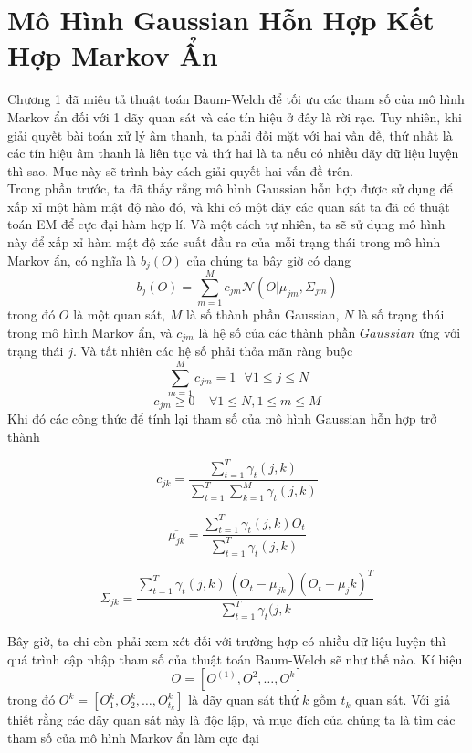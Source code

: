 \documentclass[13pt]{extreport}
\begin{document}
\section{Mô Hình Gaussian Hỗn Hợp Kết Hợp Markov Ẩn}
Chương 1 đã miêu tả thuật toán Baum-Welch để tối ưu các tham số của mô hình Markov ẩn đối với 1 dãy quan sát và các tín hiệu ở đây là rời rạc. Tuy nhiên, khi giải quyết bài toán xử lý âm thanh, ta phải đối mặt với hai vấn đề, thứ nhất là các tín hiệu âm thanh là liên tục và thứ hai là ta nếu có nhiều dãy dữ liệu luyện thì sao. Mục này sẽ trình bày cách giải quyết hai vấn đề trên. \\
Trong phần trước, ta đã thấy rằng mô hình Gaussian hỗn hợp được sử dụng để xấp xỉ một hàm mật độ nào đó, và khi có một dãy các quan sát ta đã có thuật toán EM để cực đại hàm hợp lí. Và một cách tự nhiên, ta sẽ sử dụng mô hình này để xấp xỉ hàm mật độ xác suất đầu ra của mỗi trạng thái trong mô hình Markov ẩn, có nghĩa là $b_j(O)$ của chúng ta bây giờ có dạng
$$b_j(O) = \sum_{m=1}^M c_{jm} \mathcal{N}(O| \mu_{jm}, \Sigma_{jm})$$
trong đó $O$ là một quan sát, $M$ là số thành phần Gaussian, $N$ là số trạng thái trong mô hình Markov ẩn, và $c_{jm}$ là hệ số của các thành phần $Gaussian$ ứng với trạng thái $j$. Và tất nhiên các hệ số phải thỏa mãn ràng buộc
$$\sum_{m=1}^{M} c_{jm} = 1 \ \ \ \forall 1 \leq j \leq N$$
$$c_{jm} \geq 0 \ \ \ \ \ \forall 1 \leq N, 1 \leq m \leq M$$
Khi đó các công thức để tính lại tham số của mô hình Gaussian hỗn hợp trở thành

\begin{equation}
    \overline{c_{jk}} = \dfrac{\sum\limits_{t=1}^{T} \gamma_{t}(j, k)}{\sum\limits_{t=1}^{T} \sum\limits_{k=1}^M \gamma_t(j, k)}
\end{equation}

\begin{equation}
\overline{\mu_{jk}} = \dfrac{\sum\limits_{t=1}^{T} \gamma_t(j, k) O_t}{\sum\limits_{t=1}^{T} \gamma_t(j,k)}
\end{equation}

\begin{equation}
\overline{\Sigma_{jk}} = \frac{\sum\limits_{t=1}^{T} \gamma_t(j, k) \ (O_t - \mu_{jk}) (O_t - \mu_jk)^T}{\sum\limits_{t=1}^T \gamma_t(j, k}
\end{equation}

Bây giờ, ta chi còn phải xem xét đối với trường hợp có nhiều dữ liệu luyện thì quá trình cập nhập tham số của thuật toán Baum-Welch sẽ như thế nào. Kí hiệu
$$ O = [O^{(1)}, O^{2}, \dots, O^{k}]$$
trong đó $O^{k} = [O_1^{k}, O_2^{k}, \dots, O_{t_k}^{k}]$ là dãy quan sát thứ $k$ gồm $t_k$ quan sát. Với giả thiết rằng các dãy quan sát này là độc lập, và mục đích của chúng ta là tìm các tham số của mô hình Markov ẩn làm cực đại
\end{document}
